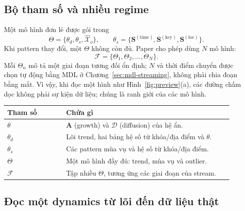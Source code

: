 \subsection{Bộ tham số và nhiều regime}

Một mô hình đơn lẻ được gói trong
\[
  \Theta=\{\theta_d,\theta_s,\widehat{\mathcal{X}}_o\},
  \qquad
  \theta_s=\{\mathbf{S}^{(\mathrm{time})},\mathbf{S}^{(\mathrm{key})},
             \mathbf{S}^{(\mathrm{loc})}\}.
\]
Khi pattern thay đổi, một $\Theta$ không còn đủ. Paper cho phép dùng $N$ mô hình:
\[
  \mathcal{F}=\{\Theta_1,\Theta_2,\ldots,\Theta_N\}.
\]
Mỗi $\Theta_n$ mô tả một giai đoạn tương đối ổn định; $N$ và thời điểm chuyển được chọn tự động
bằng MDL ở Chương~\ref{sec:mdl-streaming}, không phải chia đoạn bằng mắt. Vì vậy, khi đọc một
hình như Hình~\ref{fig:preview}(a), các đường chấm dọc không phải sự kiện dữ liệu; chúng là ranh
giới của các mô hình.

\begin{center}
\small
\begin{tabular}{@{}p{0.24\linewidth}p{0.68\linewidth}@{}}
  \toprule
  Tham số & Chứa gì \\
  \midrule
  $\theta$ & $\mathbf{A}$ (growth) và $\mathcal{D}$ (diffusion) của hệ ẩn. \\
  $\theta_d$ & Lõi trend, hai bảng hệ số từ khóa/địa điểm và $\theta$. \\
  $\theta_s$ & Các pattern mùa vụ và hệ số từ khóa/địa điểm. \\
  $\Theta$ & Một mô hình đầy đủ: trend, mùa vụ và outlier. \\
  $\mathcal{F}$ & Tập nhiều $\Theta$, tương ứng các giai đoạn của stream. \\
  \bottomrule
\end{tabular}
\end{center}

\subsection{Đọc một dynamics từ lõi đến dữ liệu thật}

